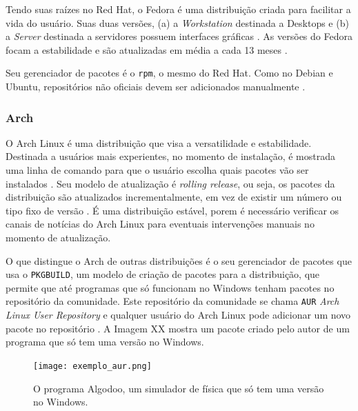 \documentclass[
article,			%
12pt,				%
openright,			%
oneside,			%
a4paper,			%
chapter=TITLE,		%
section=TITLE,		%
subsection=TITLE,	%
subsubsection=TITLE,%
subsubsubsection=TITLE, %
english,			%
brazil,				%
]{abntex2}
\def\code#1{\texttt{#1}}
\begin{document}
Tendo suas raízes no Red Hat, o Fedora é uma distribuição criada para
facilitar a vida do usuário. Suas duas versões, (a) a
\emph{Workstation} destinada a Desktops e (b) a \emph{Server}
destinada a servidores possuem interfaces gráficas
\cite{FedoraProject2018}. As versões do Fedora focam a estabilidade e
são atualizadas em média a cada 13 meses \cite{FedoraProject2018a}.

Seu gerenciador de pacotes é o \code{rpm}, o mesmo do Red Hat. Como no
Debian e Ubuntu, repositórios não oficiais devem ser adicionados
manualmente \cite{FedoraProject2018b}.

\subsubsection{Arch}

O Arch Linux é uma distribuição que visa a versatilidade e
estabilidade. Destinada a usuários mais experientes, no momento de
instalação, é mostrada uma linha de comando para que o usuário escolha
quais pacotes vão ser instalados \cite{ArchWiki2018a}. Seu modelo de
atualização é \emph{rolling release}, ou seja, os pacotes da
distribuição são atualizados incrementalmente, em vez de existir um
número ou tipo fixo de versão \cite{ArchWiki2018c}. É uma distribuição
estável, porem é necessário verificar os canais de notícias do Arch
Linux para eventuais intervenções manuais no momento de atualização.

O que distingue o Arch de outras distribuições é o seu gerenciador de
pacotes  que usa o \code{PKGBUILD}, um modelo de criação
de pacotes para a distribuição, que permite que até programas que só
funcionam no Windows tenham pacotes no repositório da comunidade. Este
repositório da comunidade se chama \code{AUR} \emph{Arch Linux User
Repository} e qualquer usuário do Arch Linux pode adicionar um novo
pacote no repositório \cite{ArchWiki2018d}. A Imagem XX mostra um
pacote criado pelo autor de um programa que só tem uma versão no
Windows.

\begin{figure}[!htbp]
    \caption{\label{fig:exemplo-aur}O programa Algodoo, um simulador
    de física que só tem uma versão no Windows.}
    \begin{center}
        \texttt{[image: exemplo\_aur.png]}
    \end{center}
\end{figure}

\pagebreak 
\end{document}
